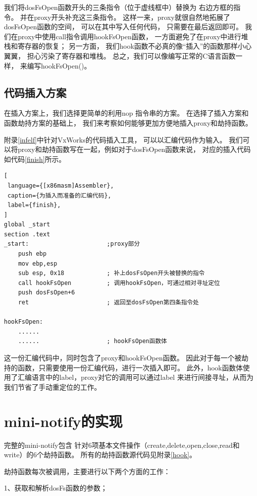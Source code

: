 我们将dosFsOpen函数开头的三条指令（位于虚线框中）替换为
右边方框的指令。
并在proxy开头补充这三条指令。
这样一来，proxy就很自然地拓展了dosFsOpen函数的空间，
可以在其中写入任何代码，
只需要在最后返回即可。
我们在proxy中使用call指令调用hookFsOpen函数，
一方面避免了在proxy中进行堆栈和寄存器的恢复；
另一方面，
我们hook函数不必真的像“插入”的函数那样小心翼翼，
担心污染了寄存器和堆栈。
总之，我们可以像编写正常的C语言函数一样，
来编写hookFsOpen()。

\subsection{代码插入方案}

在插入方案上，我们选择更简单的利用nop
指令串的方案。
在选择了插入方案和函数劫持方案的基础上，
我们来考察如何能够更加方便地插入proxy和劫持函数。

附录\ref{infelf}中针对VxWorks的代码插入工具，
可以以汇编代码作为输入。
我们可以将proxy和劫持函数写在一起，例如对于dosFsOpen函数来说，
对应的插入代码如代码\ref{finish}所示。

\begin{lstlisting}[
 language={[x86masm]Assembler},
 caption={为插入而准备的汇编代码},
 label={finish},
]
global _start
section .text
_start:                      ;proxy部分
    push ebp
    mov ebp,esp
    sub esp, 0x18            ; 补上dosFsOpen开头被替换的指令
    call hookFsOpen          ; 调用hookFsOpen，可通过相对寻址定位
    push dosFsOpen+6
    ret                      ; 返回至dosFsOpen第四条指令处

hookFsOpen:
    ......
    ......                   ; hookFsOpen函数体
\end{lstlisting}

这一份汇编代码中，同时包含了proxy和hookFsOpen函数。
因此对于每一个被劫持的函数，只需要使用一份汇编代码，进行一次插入即可。
此外，hook函数体使用了汇编语言中的label，proxy对它的调用可以通过label
来进行间接寻址，从而为我们节省了手动重定位的工作。

\section{mini-notify的实现}

完整的mini-notify包含
针对6项基本文件操作（create,delete,open,close,read和write）的6个劫持函数。
所有的劫持函数源代码见附录\ref{hook}。

劫持函数每次被调用，主要进行以下两个方面的工作：

1、获取和解析dosFs函数的参数；

